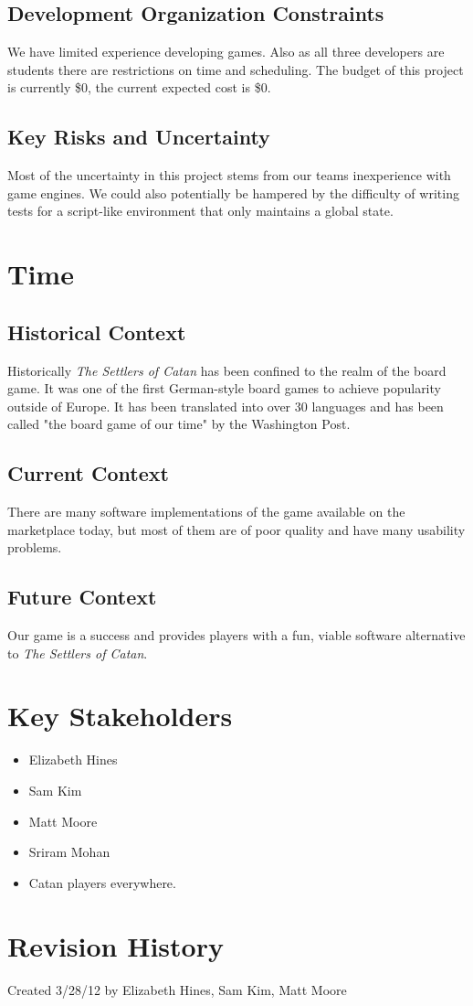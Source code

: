 \documentclass[12pt]{article}
\begin{document}
\subsection{Development Organization Constraints}
We have limited experience developing games. Also as all three developers are students there are restrictions on time and scheduling. The budget of this project is currently \$0, the current expected cost is \$0.

\subsection{Key Risks and Uncertainty}
Most of the uncertainty in this project stems from our teams inexperience with game engines. We could also potentially be hampered by the difficulty of writing tests for a script-like environment that only maintains a global state. 

\section{Time}

\subsection{Historical Context}
Historically \emph{The Settlers of Catan} has been confined to the realm of the board game. It was one of the first German-style board games to achieve popularity outside of Europe. It has been translated into over 30 languages and has been called "the board game of our time" by the Washington Post.

\subsection{Current Context}
There are many software implementations of the game available on the marketplace today, but most of them are of poor quality and have many usability problems.

\subsection{Future Context}
Our game is a success and provides players with a fun, viable software alternative to \emph{The Settlers of Catan}.

\section{Key Stakeholders}
\begin{itemize}
\item Elizabeth Hines
\item Sam Kim
\item Matt Moore
\item Sriram Mohan
\item Catan players everywhere.
\end{itemize}
\newpage
\section{Revision History}
Created 3/28/12 by Elizabeth Hines, Sam Kim, Matt Moore
\end{document}
